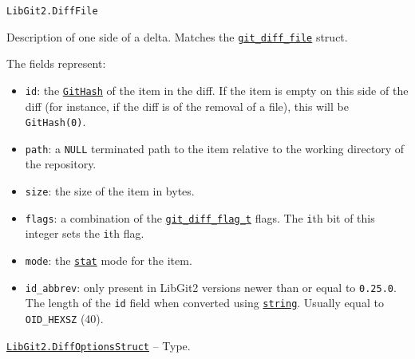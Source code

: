 \begin{adjustwidth}{2em}{0pt}


\begin{verbatim}
LibGit2.DiffFile
\end{verbatim}

Description of one side of a delta. Matches the \href{https://libgit2.org/libgit2/\#HEAD/type/git\_diff\_file}{\texttt{git\_diff\_file}} struct.

The fields represent:

\begin{itemize}
\item \texttt{id}: the \hyperlink{202290709580230708}{\texttt{GitHash}} of the item in the diff. If the item is empty on this  side of the diff (for instance, if the diff is of the removal of a file), this will  be \texttt{GitHash(0)}.


\item \texttt{path}: a \texttt{NULL} terminated path to the item relative to the working directory of the repository.


\item \texttt{size}: the size of the item in bytes.


\item \texttt{flags}: a combination of the \href{https://libgit2.org/libgit2/\#HEAD/type/git\_diff\_flag\_t}{\texttt{git\_diff\_flag\_t}}  flags. The \texttt{i}th bit of this integer sets the \texttt{i}th flag.


\item \texttt{mode}: the \hyperlink{10861694406169986183}{\texttt{stat}} mode for the item.


\item \texttt{id\_abbrev}: only present in LibGit2 versions newer than or equal to \texttt{0.25.0}.  The length of the \texttt{id} field when converted using \hyperlink{7919678712989769360}{\texttt{string}}. Usually equal to \texttt{OID\_HEXSZ} (40).

\end{itemize}


\end{adjustwidth}
\hypertarget{12061588653487632733}{}
\hyperlink{12061588653487632733}{\texttt{LibGit2.DiffOptionsStruct}}  -- {Type.}

